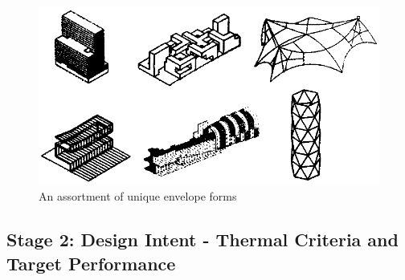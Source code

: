\begin{figure}
	\centering
	\includegraphics[width=0.95\textheight]{./Images/23-StageA}
	\caption[Assortment of unique building envelope forms]{An assortment of unique envelope forms \cite{foa04}}
\end{figure}

\clearpage
\subsection{Stage 2: Design Intent - Thermal Criteria and Target Performance}
\label{sec:Stage2}
\vspace{0.5cm}

